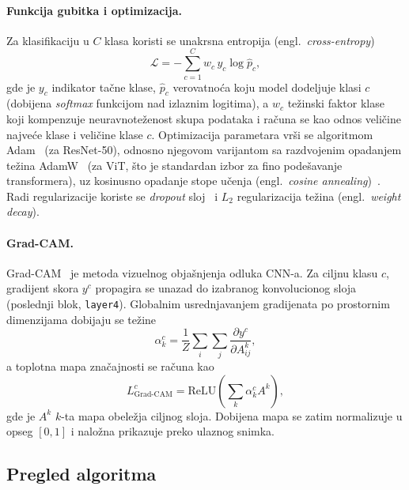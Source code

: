 \documentclass[12pt,a4paper]{article}
\begin{document}
\paragraph{Funkcija gubitka i optimizacija.}
Za klasifikaciju u $C$ klasa koristi se unakrsna entropija (engl.\ \textit{cross-entropy})
\begin{equation}
\mathcal{L} = -\sum_{c=1}^{C} w_c \, y_c \log \hat{p}_c,
\label{eq:ce}
\end{equation}
gde je $y_c$ indikator tačne klase, $\hat{p}_c$ verovatnoća koju model dodeljuje klasi
$c$ (dobijena \textit{softmax} funkcijom nad izlaznim logitima), a $w_c$ težinski faktor
klase koji kompenzuje neuravnoteženost skupa podataka i računa se kao odnos veličine
najveće klase i veličine klase $c$. Optimizacija parametara vrši se algoritmom
Adam~\cite{kingma2015adam} (za ResNet-50), odnosno njegovom varijantom sa razdvojenim
opadanjem težina AdamW~\cite{loshchilov2019adamw} (za ViT, što je standardan izbor za
fino podešavanje transformera), uz kosinusno opadanje stope učenja (engl.\ \textit{cosine
annealing})~\cite{loshchilov2017sgdr}. Radi regularizacije koriste se \textit{dropout}
sloj~\cite{srivastava2014dropout} i $L_2$ regularizacija težina (engl.\ \textit{weight
decay}).

\paragraph{Grad-CAM.}
Grad-CAM~\cite{selvaraju2017gradcam} je metoda vizuelnog objašnjenja odluka CNN-a. Za
ciljnu klasu $c$, gradijent skora $y^c$ propagira se unazad do izabranog konvolucionog
sloja (poslednji blok, \texttt{layer4}). Globalnim usrednjavanjem gradijenata po
prostornim dimenzijama dobijaju se težine
\begin{equation}
\alpha_k^c = \frac{1}{Z}\sum_{i}\sum_{j}\frac{\partial y^c}{\partial A^k_{ij}},
\label{eq:gradcam-alpha}
\end{equation}
a toplotna mapa značajnosti se računa kao
\begin{equation}
L^c_{\text{Grad-CAM}} = \mathrm{ReLU}\!\left(\sum_k \alpha_k^c A^k\right),
\label{eq:gradcam}
\end{equation}
gde je $A^k$ $k$-ta mapa obeležja ciljnog sloja. Dobijena mapa se zatim normalizuje u
opseg $[0,1]$ i naložna prikazuje preko ulaznog snimka.

\subsection{Pregled algoritma}
\label{sec:pipeline}
\end{document}
